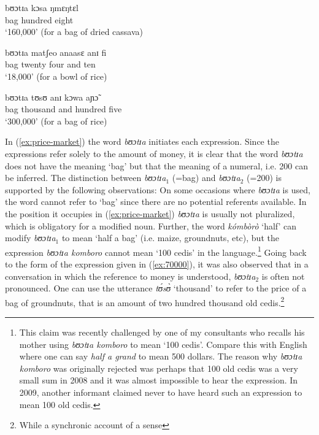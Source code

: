 \begin{exe}
\begin{exe}
\begin{exe}
{\begin{exe}
\begin{exe}
\begin{exe}
\begin{exe}
\begin{exe}
\begin{exe}
\begin{exe}
\begin{xlist}
\begin{exe}
\begin{exe}
\begin{exe}
\ex\label{ex:cassavabag}
\gll bʊɔtɪa kɔsa ŋmɛŋtɛl\\
bag hundred eight\\
\glt `160,000' (for a bag of dried cassava) 


\ex\label{ex:ricebowl}
\gll bʊɔtɪa matʃeo anaasɛ anɪ fi\\
bag twenty four and ten\\
\glt `18,000' (for a bowl of rice) 

\ex\label{ex:Ricebag}
\gll bʊɔtɪa tʊsʊ anɪ kɔwa  aɲɔ̃\\
bag thousand and hundred five\\
\glt `300,000' (for a bag of rice) 


\z
\z


In (\ref{ex:price-market}) the word {\it bʊɔtɪa} initiates  each expression.
Since the
expressions refer solely to the amount of money, it is clear that the word {\it
bʊɔtɪa} does not have the  meaning `bag' but that  the
meaning of a numeral, i.e. 200 can be inferred. The distinction between {\it
bʊɔtɪa}$_{1}$ (=bag)
and {\it bʊɔtɪa}$_{2}$  (=200) is supported by the following observations:  On 
some
occasions where  {\it bʊɔtɪa} is used,  the word cannot refer to `bag' since
there are no potential referents available. In the position it occupies in
(\ref{ex:price-market}) {\it bʊɔtɪa} is usually not pluralized, which is
obligatory for a modified noun. Further, the word {\it kómbòrò} `half' can 
modify
{\it 
bʊɔtɪa}$_{1}$  to mean `half a bag' (i.e. maize, groundnuts, etc), but  the
expression {\it bʊɔtɪa komboro} cannot mean `100 cedis' in the
language.\footnote{This claim was recently challenged by one of my consultants
who recalls his  mother using  {\it bʊɔtɪa komboro} to mean `100 cedis'.  
Compare
this with English  where one can say \textit{half a grand} to mean 500
dollars. The reason why {\it bʊɔtɪa komboro} was originally rejected was perhaps
that 100 old cedis was a very small sum  in 2008 and it was almost impossible
to hear the expression. In 2009,  another informant claimed never to have
heard such an expression to mean 100 old cedis.}  Going back to the form of the
expression given in
(\ref{ex:70000}),
it was also observed that in a conversation in which the reference to money is
understood, {\it bʊɔtɪa}$_{2}$  is often not pronounced. One can use the 
utterance {\it tʊ́sʊ̀}  `thousand' to refer to the price of a bag of 
groundnuts, that is an
amount of
two hundred thousand old cedis.\footnote{While a synchronic account of a sense
}
\end{exe}
\end{exe}
\end{exe}
\end{xlist}
\end{exe}
\end{exe}
\end{exe}
\end{exe}
\end{exe}
\end{exe}
\end{exe}}
\end{exe}
\end{exe}
\end{exe}
